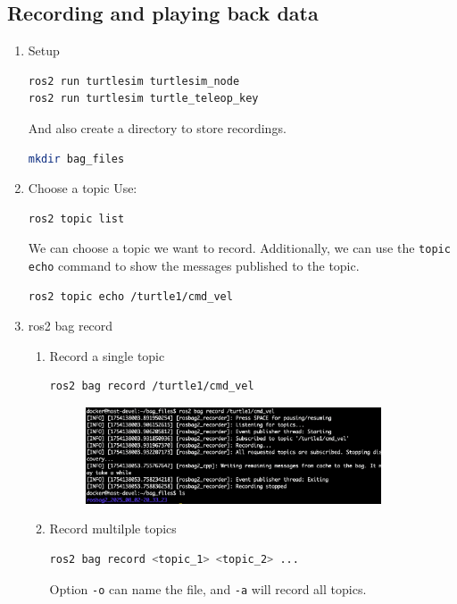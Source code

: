 \documentclass[12pt, a4paper]{article}
\begin{document}
\subsection{Recording and playing back data}
\begin{enumerate}
	\item Setup
\begin{lstlisting}[language=bash]
ros2 run turtlesim turtlesim_node
ros2 run turtlesim turtle_teleop_key
\end{lstlisting}
And also create a directory to store recordings.
\begin{lstlisting}[language=bash]
mkdir bag_files
\end{lstlisting}
\item Choose a topic
Use:
\begin{lstlisting}[language=bash]
ros2 topic list
\end{lstlisting}
We can choose a topic we want to record. Additionally, we can use the \texttt{topic echo} command to show the messages published to the topic.
\begin{lstlisting}[language=bash]
ros2 topic echo /turtle1/cmd_vel
\end{lstlisting}

\item ros2 bag record
\begin{enumerate}
	\item Record a single topic
\begin{lstlisting}[language=bash]
ros2 bag record /turtle1/cmd_vel
\end{lstlisting}
\begin{figure}[h]
	\setlength{\leftskip}{4.4em}
	\includegraphics[width=0.88\textwidth]{p1.10-1}
\end{figure}
\item Record multilple topics
\begin{lstlisting}[language=bash]
ros2 bag record <topic_1> <topic_2> ...
\end{lstlisting}
Option \texttt{-o} can name the file, and \texttt{-a} will record all topics.
\end{enumerate}


\end{enumerate}
\end{document}
